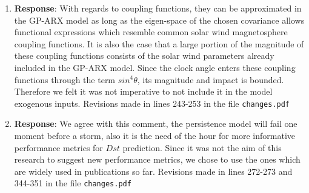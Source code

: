 \documentclass{article}
\begin{document}
\begin{enumerate}
{}

\item{



\textbf{Response}: With regards to coupling functions, they can be approximated in the GP-ARX model as long as the eigen-space of the chosen covariance allows functional expressions which resemble common solar wind magnetosphere coupling functions. It is also the case that a large portion of the magnitude of these coupling functions consists of the solar wind parameters already included in the GP-ARX model. Since the clock angle enters these coupling functions through the term $sin^4 \theta$, its magnitude and impact is bounded. Therefore we felt it was not imperative to not include it in the model exogenous inputs. Revisions made in lines 243-253 in the file \texttt{changes.pdf}


}


\item{



\textbf{Response}: We agree with this comment, the persistence model will fail one moment before a storm, also it is the need of the hour for more informative performance metrics for $Dst$ prediction. Since it was not the aim of this research to suggest new performance metrics, we chose to use the ones which are widely used in publications so far. Revisions made in lines 272-273 and 344-351 in the file \texttt{changes.pdf}


}
\end{enumerate}
\end{document}
